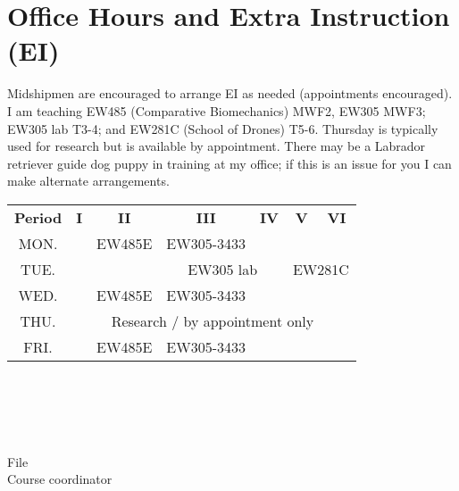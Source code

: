 \documentclass[11pt,courier]{navymemo}
\begin{document}
\section{Office Hours and Extra Instruction (EI)} Midshipmen are encouraged to arrange EI as needed (appointments encouraged). I am teaching EW485 (Comparative Biomechanics) MWF2, EW305 MWF3; EW305 lab T3-4; and EW281C (School of Drones) T5-6. Thursday is typically used for research but is available by appointment. There may be a Labrador retriever guide dog puppy in training at my office; if this is an issue for you I can make alternate arrangements. 
\begin{table}[h]
\begin{center}
\begin{tabular}[h]{| c | c | c | c | c | c | c |}
\hline
\bf Period & \bf I & \bf II & \bf III & \bf IV & \bf V & \bf VI\\
\hhline{~|*6-}
MON. & & \cellcolor{green}EW485E & \cellcolor{green}EW305-3433 & & &\\
\hhline{~|*6-}
TUE. & & & \multicolumn{2}{c}{\cellcolor{orange}\parbox[t]{3cm}{EW305 lab}} & \multicolumn{2}{c}{\cellcolor{orange}\parbox[t]{3cm}{EW281C}} \\
\hhline{~|*6-}
WED. & & \cellcolor{green}EW485E & \cellcolor{green}EW305-3433 & & &\\
\hhline{~|*6-}
THU. & \multicolumn{6}{c}{\cellcolor{yellow}Research / by appointment only}\\
\hhline{~|*6-}
FRI. & & \cellcolor{green}EW485E & \cellcolor{green}EW305-3433 & & &\\
\hline
\end{tabular}
\end{center}
\end{table}

\noclosing{}\\
\noindent\hspace*{4in}
\signature{D Evangelista}

\noindent\hspace*{4in}{207 Maury Hall}\\
\hspace*{4in}{(410) 293-6132}\\

\copyto{}
File\\
Course coordinator


\navyrecordnote
\thispagestyle{empty}
\end{document}
